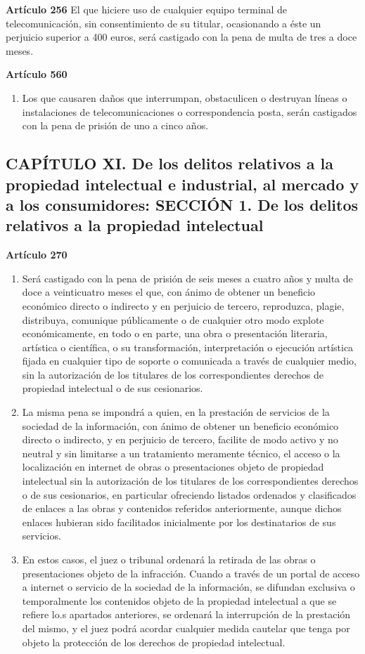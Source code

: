 \textbf{Artículo 256}
El que hiciere uso de cualquier equipo terminal de telecomunicación, sin consentimiento de su titular, ocasionando a éste un perjuicio superior a 400 euros, será castigado con la pena de multa de tres a doce meses.

\textbf{Artículo 560}
\begin{enumerate}[label=\textbf{\arabic*.}]
    \item Los que causaren daños que interrumpan, obstaculicen o destruyan líneas o instalaciones de telecomunicaciones o correspondencia posta, serán castigados con la pena de prisión de uno a cinco años.
\end{enumerate}

\subsection{CAPÍTULO XI. De los delitos relativos a la propiedad intelectual e industrial, al mercado y a los consumidores: SECCIÓN 1. De los delitos relativos a la propiedad intelectual}

\textbf{Artículo 270}
\begin{enumerate}[label=\textbf{\arabic*.}]
    \item Será castigado con la pena de prisión de seis meses a cuatro años y multa de doce a veinticuatro meses el que, con ánimo de obtener un beneficio económico directo o indirecto y en perjuicio de tercero, reproduzca, plagie, distribuya, comunique públicamente o de cualquier otro modo explote económicamente, en todo o en parte, una obra o presentación literaria, artística o científica, o su transformación, interpretación o ejecución artística fijada en cualquier tipo de soporte o comunicada a través de cualquier medio, sin la autorización de los titulares de los correspondientes derechos de propiedad intelectual o de sus cesionarios.
    \item La misma pena se impondrá a quien, en la prestación de servicios de la sociedad de la información, con ánimo de obtener un beneficio económico directo o indirecto, y en perjuicio de tercero, facilite de modo activo y no neutral y sin limitarse a un tratamiento meramente técnico, el acceso o la localización en internet de obras o presentaciones objeto de propiedad intelectual sin la autorización de los titulares de los correspondientes derechos o de sus cesionarios, en particular ofreciendo listados ordenados y clasificados de enlaces a las obras y contenidos referidos anteriormente, aunque dichos enlaces hubieran sido facilitados inicialmente por los destinatarios de sus servicios.
    \item En estos casos, el juez o tribunal ordenará la retirada de las obras o presentaciones objeto de la infracción. Cuando a través de un portal de acceso a internet o servicio de la sociedad de la información, se difundan exclusiva o temporalmente los contenidos objeto de la propiedad intelectual a que se refiere lo.s apartados anteriores, se ordenará la interrupción de la prestación del mismo, y el juez podrá acordar cualquier medida cautelar que tenga por objeto la protección de los derechos de propiedad intelectual.
\end{enumerate}

